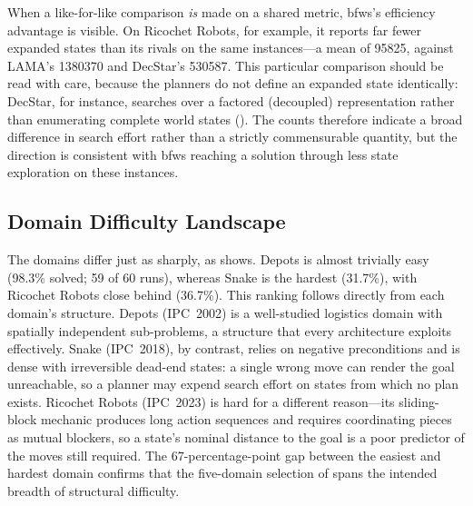 When a like-for-like comparison \emph{is} made on a shared metric, \gls{bfws}'s efficiency advantage is visible.
On Ricochet Robots, for example, it reports far fewer expanded states than its rivals on the same instances---a mean of \num{95825}, against LAMA's \num{1380370} and DecStar's \num{530587}.
This particular comparison should be read with care, because the planners do not define an expanded state identically: DecStar, for instance, searches over a factored (decoupled) representation rather than enumerating complete world states ().
The counts therefore indicate a broad difference in search effort rather than a strictly commensurable quantity, but the direction is consistent with \gls{bfws} reaching a solution through less state exploration on these instances.

\subsection{Domain Difficulty Landscape}
\label{sec:results:stage0:domains}

The domains differ just as sharply, as  shows.
Depots is almost trivially easy (98.3\% solved; 59 of 60 runs), whereas Snake is the hardest (31.7\%), with Ricochet Robots close behind (36.7\%).
This ranking follows directly from each domain's structure.
Depots (IPC~2002) is a well-studied logistics domain with spatially independent sub-problems, a structure that every architecture exploits effectively.
Snake (IPC~2018), by contrast, relies on negative preconditions and is dense with irreversible dead-end states: a single wrong move can render the goal unreachable, so a planner may expend search effort on states from which no plan exists.
Ricochet Robots (IPC~2023) is hard for a different reason---its sliding-block mechanic produces long action sequences and requires coordinating pieces as mutual blockers, so a state's nominal distance to the goal is a poor predictor of the moves still required.
The 67-percentage-point gap between the easiest and hardest domain confirms that the five-domain selection of  spans the intended breadth of structural difficulty.

